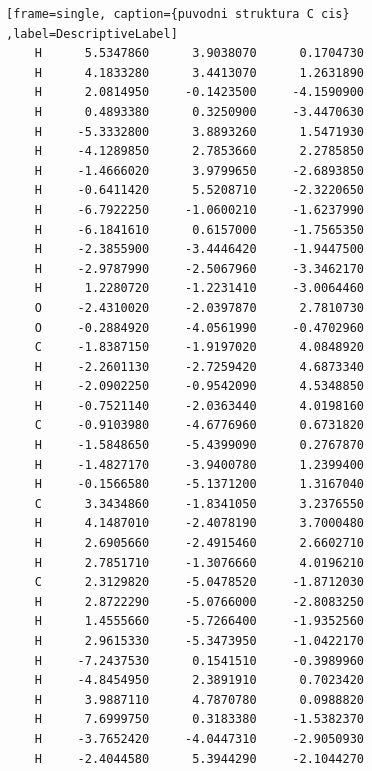\documentclass[
  digital, %
  table,   %
  lof,     %
  lot,     %
  oneside,
]{fithesis3}
\begin{document}
\begin{lstlisting}[frame=single, caption={puvodni struktura C cis} ,label=DescriptiveLabel]
    H      5.5347860      3.9038070      0.1704730
    H      4.1833280      3.4413070      1.2631890
    H      2.0814950     -0.1423500     -4.1590900
    H      0.4893380      0.3250900     -3.4470630
    H     -5.3332800      3.8893260      1.5471930
    H     -4.1289850      2.7853660      2.2785850
    H     -1.4666020      3.9799650     -2.6893850
    H     -0.6411420      5.5208710     -2.3220650
    H     -6.7922250     -1.0600210     -1.6237990
    H     -6.1841610      0.6157000     -1.7565350
    H     -2.3855900     -3.4446420     -1.9447500
    H     -2.9787990     -2.5067960     -3.3462170
    H      1.2280720     -1.2231410     -3.0064460
    O     -2.4310020     -2.0397870      2.7810730
    O     -0.2884920     -4.0561990     -0.4702960
    C     -1.8387150     -1.9197020      4.0848920
    H     -2.2601130     -2.7259420      4.6873340
    H     -2.0902250     -0.9542090      4.5348850
    H     -0.7521140     -2.0363440      4.0198160
    C     -0.9103980     -4.6776960      0.6731820
    H     -1.5848650     -5.4399090      0.2767870
    H     -1.4827170     -3.9400780      1.2399400
    H     -0.1566580     -5.1371200      1.3167040
    C      3.3434860     -1.8341050      3.2376550
    H      4.1487010     -2.4078190      3.7000480
    H      2.6905660     -2.4915460      2.6602710
    H      2.7851710     -1.3076660      4.0196210
    C      2.3129820     -5.0478520     -1.8712030
    H      2.8722290     -5.0766000     -2.8083250
    H      1.4555660     -5.7266400     -1.9352560
    H      2.9615330     -5.3473950     -1.0422170
    H     -7.2437530      0.1541510     -0.3989960
    H     -4.8454950      2.3891910      0.7023420
    H      3.9887110      4.7870780      0.0988820
    H      7.6999750      0.3183380     -1.5382370
    H     -3.7652420     -4.0447310     -2.9050930
    H     -2.4044580      5.3944290     -2.1044270

  \end{lstlisting}
\end{document}
